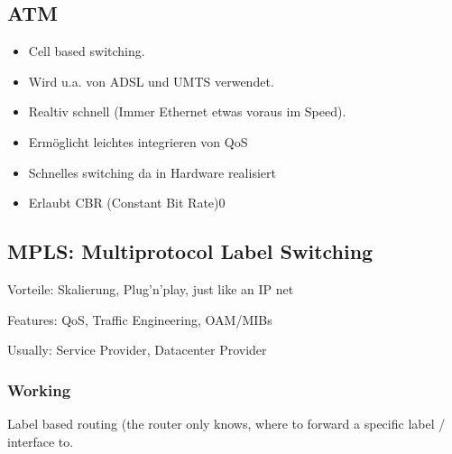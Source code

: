 \subsection{ATM}

\begin{itemize}
	\item Cell based switching.
	\item Wird u.a. von ADSL und UMTS verwendet.
	\item Realtiv schnell (Immer Ethernet etwas voraus im Speed).
	\item Ermöglicht leichtes integrieren von QoS
	\item Schnelles switching da in Hardware realisiert
	\item Erlaubt CBR (Constant Bit Rate)0
\end{itemize}

\subsection{MPLS: Multiprotocol Label Switching}

Vorteile: Skalierung, Plug'n'play, just like an IP net


Features: QoS, Traffic Engineering, OAM/MIBs

Usually: Service Provider, Datacenter Provider

\subsubsection{Working}

Label based routing (the router only knows, where to forward a specific label / interface to.

